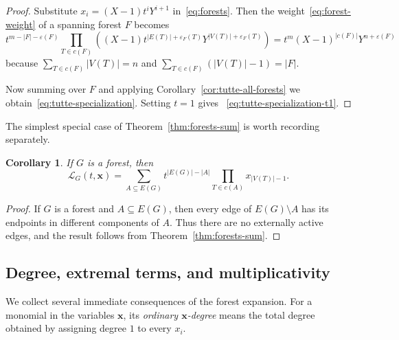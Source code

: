 \documentclass[11pt]{article}
\theoremstyle{plain}
\newtheorem{corollary}[theorem]{Corollary}
\theoremstyle{definition}
\renewcommand{\mathcal}{\mathscr}
\newcommand{\ds}{\displaystyle}
\newcommand{\LL}{\mathcal{L}}    %
\newcommand{\bx}{\mathbf{x}}
\numberwithin{equation}{section}
\begin{document}
\begin{proof}
Substitute $ x_i=(X-1)t^iY^{i+1}$ in~\eqref{eq:forests}.
Then the weight~\eqref{eq:forest-weight} of a spanning forest $F$ becomes
\[
t^{m-|F|-\varepsilon(F)}  \prod_{T\in c(F)}
 \left((X-1)t^{|E(T)|+\varepsilon_F(T)}
 Y^{|V(T)|+\varepsilon_F(T)}\right)
=  t^m(X-1)^{|c(F)|}Y^{n+\varepsilon(F)}
\]
because $\ds  \sum_{T\in c(F)}|V(T)|=n $ and $\ds  \sum_{T\in c(F)}(|V(T)|-1)=|F| $.

Now summing over $F$  and applying  Corollary~\ref{cor:tutte-all-forests} we obtain~\eqref{eq:tutte-specialization}.
%
Setting $t=1$ gives~ \eqref{eq:tutte-specialization-t1}.
\end{proof}

The simplest special case of Theorem~\ref{thm:forests-sum} is worth recording separately.

\begin{corollary}\label{cor:forest-L}
  If $G$ is a forest, then
  \begin{equation}
    \label{eq:loopy-forests}
    \LL_G(t,\bx)  =  \sum_{A\subseteq E(G)}
    t^{|E(G)|-|A|}  \prod_{T\in c(A)}x_{|V(T)|-1}.
  \end{equation}
\end{corollary}

\begin{proof}
If $G$ is a forest and $A\subseteq E(G)$, then every edge of   $E(G)\setminus A$ has its endpoints in different components of $A$.
  Thus there are no externally active edges, and the result follows from Theorem~\ref{thm:forests-sum}.
\end{proof}


\subsection{Degree, extremal terms, and multiplicativity}\label{sec:corols}

We collect several immediate consequences of the forest expansion.  For a
monomial in the variables $\bx$, its \emph{ordinary $\bx$-degree} means the
total degree obtained by assigning degree $1$ to every $x_i$.
\end{document}
